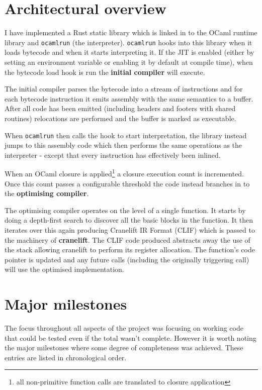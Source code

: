 \section{Architectural overview}



I have implemented a Rust static library which is linked in to the OCaml runtime library and
\texttt{ocamlrun} (the interpreter).
\texttt{ocamlrun} hooks into this library when it loads bytecode and when it starts
interpreting it.
If the JIT is enabled (either by setting an environment variable or enabling it by default at
compile time),
when the bytecode load hook is run the \textbf{initial compiler} will execute.

The initial compiler parses the bytecode into a stream of instructions and for each bytecode
instruction
it emits assembly with the same semantics to a buffer. After all code has been emitted (including
headers
and footers with shared routines) relocations are performed and the buffer is marked as executable.

When \texttt{ocamlrun} then calls the hook to start interpretation, the library instead jumps to
this assembly code which then performs the same operations as the interpreter - except that every
instruction has effectively been inlined.

When an OCaml closure is applied\footnote{all non-primitive function calls are translated to
      closure application}
a closure execution count is incremented. Once this count passes a configurable threshold the code
instead
branches in to the \textbf{optimising compiler}.

The optimising compiler operates on the level of a single function. It starts by doing a
depth-first search to discover all the basic blocks in the function. It then iterates over this
again producing Cranelift IR Format (CLIF) which is passed to the machinery of
\textbf{cranelift}. The CLIF code produced abstracts away the use of the stack allowing cranelift
to perform its register allocation. The function's code pointer is updated and any future calls
(including the originally triggering call) will use the optimised implementation.

\section{Major milestones}

The focus throughout all aspects of the project was focusing on working code that could be tested
even if the total wasn't complete. However it is worth noting the major milestones where some
degree of completeness was achieved. These entries are listed in chronological order.

